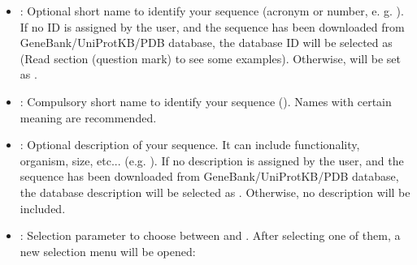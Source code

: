 \begin{itemize}
  \begin{itemize}
  \item {}: Optional short name to identify your sequence (acronym or number, e. g. ). If no ID is assigned by the user, and the sequence has been downloaded from GeneBank/UniProtKB/PDB database, the database ID will be selected as  (Read  section (question mark) to see some examples). Otherwise,  will be set as .\\
  \item {}: Compulsory short name to identify your sequence (). Names with certain meaning are recommended.\\
  \item {}: Optional description of your sequence. It can include functionality, organism, size, etc... (e.g. ). If no description is assigned by the user, and the sequence has been downloaded from GeneBank/UniProtKB/PDB database, the database description will be selected as . Otherwise, no description will be included.\\
  \item {}: Selection parameter to choose between  and . After selecting one of them, a new selection menu will be opened:\\
  

\end{itemize}
\end{itemize}
